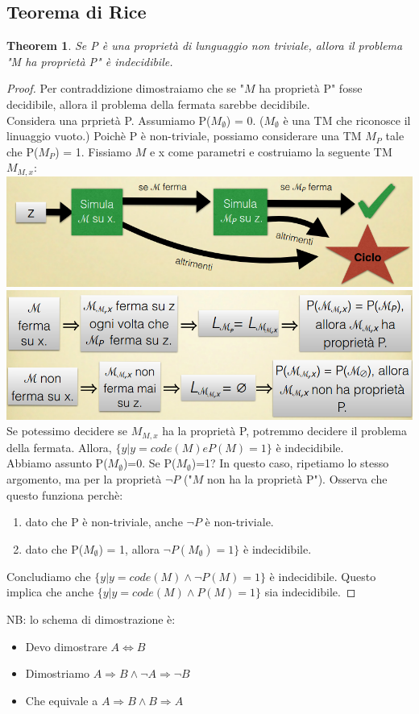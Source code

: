 \documentclass[a4paper, 12pt]{article}
\newtheorem{theorem}{Theorem}[section]
\begin{document}
\subsection{Teorema di Rice}
\begin{theorem}
Se P \`e una propriet\`a di lunguaggio non triviale, allora il problema "M ha propriet\`a P" \`e indecidibile.
\end{theorem}
\begin{proof}
Per contraddizione  dimostraiamo che se "$M$ ha propriet\`a P" fosse decidibile, allora il problema della fermata sarebbe decidibile.\\
Considera una prpriet\`a P. Assumiamo P($M_{\emptyset}$) = 0. ($M_{\emptyset}$ \`e una TM che riconosce il linuaggio vuoto.) Poich\`e P \`e non-triviale, possiamo considerare una TM $M_P$ tale che P($M_P$) = 1. Fissiamo $M$ e x come parametri e costruiamo la seguente TM $M_{M,x}$:\\
\includegraphics[scale=0.5]{TM_RICE1.png}\\
\includegraphics[scale=0.45]{RICE2.png}\\
Se potessimo decidere se $M_{M,x}$ ha la propriet\`a P, potremmo decidere il problema della fermata. Allora, $\{y|y=code(M) e P(M)=1\}$ \`e indecidibile.\\
Abbiamo assunto P($M_{\emptyset}$)=0. Se P($M_{\emptyset}$)=1? In questo caso, ripetiamo lo stesso argomento, ma per la propriet\`a $\neg P$ ("$M$ non ha la propriet\`a P"). Osserva che questo funziona perch\`e: \begin{enumerate}
\item dato che P \`e non-triviale, anche $\neg P$ \`e non-triviale.
\item dato che P($M_{\emptyset}$) = 1, allora $\neg P(M_{\emptyset}) = 1\}$ \`e indecidibile.
\end{enumerate}
Concludiamo che $\{y|y=code(M) \land \neg P(M) = 1\}$ \`e indecidibile. Questo implica che anche $\{y | y=code(M) \land P(M)=1\}$ sia indecidibile.
\end{proof}
NB: lo schema di dimostrazione \`e:
\begin{itemize}
\item Devo dimostrare $A \iff B$
\item Dimostriamo $A \Rightarrow B \land \neg A \Rightarrow \neg B$
\item Che equivale a $A \Rightarrow B \land B \Rightarrow A$
\end{itemize}
\end{document}
